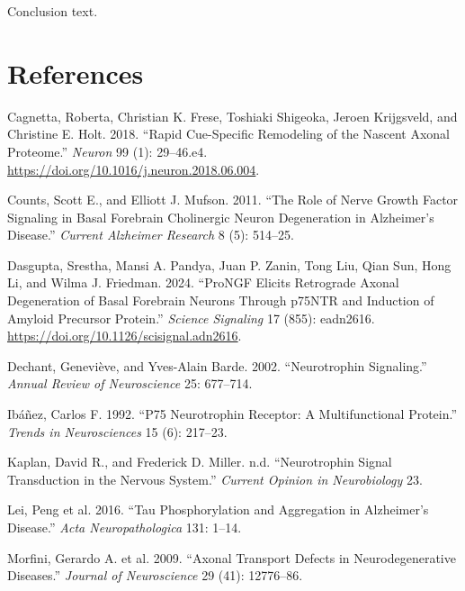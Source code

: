 \documentclass[
  letterpaper,
  DIV=11,
  numbers=noendperiod]{scrreprt}
\newlength{\cslhangindent}
\newenvironment{CSLReferences}[2] %
 {\begin{list}{}{%
  \setlength{\itemindent}{0pt}
  \setlength{\leftmargin}{0pt}
  \setlength{\parsep}{0pt}
  \ifodd #1
   \setlength{\leftmargin}{\cslhangindent}
   \setlength{\itemindent}{-1\cslhangindent}
  \fi
  \setlength{\itemsep}{#2\baselineskip}}}
 {\end{list}}
\begin{document}
Conclusion text.


\chapter*{References}\label{references}


\label{refs}
\begin{CSLReferences}{1}{0}
Cagnetta, Roberta, Christian K. Frese, Toshiaki Shigeoka, Jeroen
Krijgsveld, and Christine E. Holt. 2018. {``Rapid {Cue-Specific
Remodeling} of the {Nascent Axonal Proteome}.''} \emph{Neuron} 99 (1):
29--46.e4. \url{https://doi.org/10.1016/j.neuron.2018.06.004}.

Counts, Scott E., and Elliott J. Mufson. 2011. {``The Role of Nerve
Growth Factor Signaling in Basal Forebrain Cholinergic Neuron
Degeneration in {Alzheimer}'s Disease.''} \emph{Current Alzheimer
Research} 8 (5): 514--25.

Dasgupta, Srestha, Mansi A. Pandya, Juan P. Zanin, Tong Liu, Qian Sun,
Hong Li, and Wilma J. Friedman. 2024. {``{ProNGF} Elicits Retrograde
Axonal Degeneration of Basal Forebrain Neurons Through {p75NTR} and
Induction of Amyloid Precursor Protein.''} \emph{Science Signaling} 17
(855): eadn2616. \url{https://doi.org/10.1126/scisignal.adn2616}.

Dechant, Geneviève, and Yves-Alain Barde. 2002. {``Neurotrophin
Signaling.''} \emph{Annual Review of Neuroscience} 25: 677--714.

Ibáñez, Carlos F. 1992. {``P75 Neurotrophin Receptor: A Multifunctional
Protein.''} \emph{Trends in Neurosciences} 15 (6): 217--23.

Kaplan, David R., and Frederick D. Miller. n.d. {``Neurotrophin Signal
Transduction in the Nervous System.''} \emph{Current Opinion in
Neurobiology} 23.

Lei, Peng et al. 2016. {``Tau Phosphorylation and Aggregation in
{Alzheimer}'s Disease.''} \emph{Acta Neuropathologica} 131: 1--14.

Morfini, Gerardo A. et al. 2009. {``Axonal Transport Defects in
Neurodegenerative Diseases.''} \emph{Journal of Neuroscience} 29 (41):
12776--86.


\end{CSLReferences}
\end{document}
